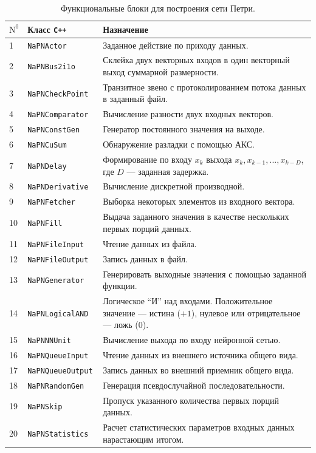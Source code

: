 \begin{table}
\centering
\caption{Функциональные блоки для построения сети Петри.}
\label{tabl:pn_objects}
\begin{tabular}{|l|l|p{11.5cm}|}
\hline
$\mathrm N^0$ & Класс \tt C++ & Назначение \\
\hline
1  & \tt NaPNActor & Заданное действие по приходу данных. \\
2  & \tt NaPNBus2i1o & Склейка двух векторных входов в один векторный выход суммарной размерности. \\
3  & \tt NaPNCheckPoint & Транзитное звено с протоколированием потока данных в заданный файл. \\
4  & \tt NaPNComparator & Вычисление разности двух входных векторов. \\
5  & \tt NaPNConstGen & Генератор постоянного значения на выходе. \\
6  & \tt NaPNCuSum & Обнаружение разладки с помощью АКС. \\
7  & \tt NaPNDelay & Формирование по входу $x_k$ выхода $x_k,x_{k-1},...,x_{k-D}$, где $D$ --- заданная задержка. \\
8  & \tt NaPNDerivative & Вычисление дискретной производной. \\
9  & \tt NaPNFetcher & Выборка некоторых элементов из входного вектора. \\
10 & \tt NaPNFill & Выдача заданного значения в качестве нескольких первых порций данных. \\
11 & \tt NaPNFileInput & Чтение данных из файла. \\
12 & \tt NaPNFileOutput & Запись данных в файл. \\
13 & \tt NaPNGenerator & Генерировать выходные значения с помощью заданной функции. \\
14 & \tt NaPNLogicalAND & Логическое ``И'' над входами.  Положительное значение --- истина ($+1$), нулевое или отрицательное --- ложь ($0$). \\
15 & \tt NaPNNNUnit & Вычисление выхода по входу нейронной сетью. \\
16 & \tt NaPNQueueInput & Чтение данных из внешнего источника общего вида. \\
17 & \tt NaPNQueueOutput & Запись данных во внешний приемник общего вида. \\
18 & \tt NaPNRandomGen & Генерация псевдослучайной последовательности. \\
19 & \tt NaPNSkip & Пропуск указанного количества первых порций данных. \\
20 & \tt NaPNStatistics & Расчет статистических параметров входных данных нарастающим итогом. \\

\end{tabular}
\end{table}
